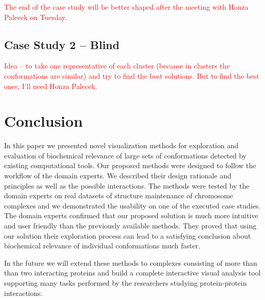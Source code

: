 \documentclass[journal]{vgtc}                %
\begin{document}
\textcolor{red}{The end of the case study will be better shaped after the meeting with Honza Palecek on Tuesday.}

\subsection{Case Study 2 -- Blind}
\textcolor{red}{Idea -- to take one representative of each cluster (because in clusters the conformations are similar) and try to find the best solutions. But to find the best ones, I'll need Honza Palecek.}

\section{Conclusion}
In this paper we presented novel visualization methods for exploration and evaluation of biochemical relevance of large sets of conformations detected by existing computational tools.
Our proposed methods were designed to follow the workflow of the domain experts.
We described their design rationale and principles as well as the possible interactions. 
The methods were tested by the domain experts on real datasets of structure maintenance of chromosome complexes and we demonstrated the usability on one of the executed case studies.
The domain experts confirmed that our proposed solution is much more intuitive and user friendly than the previously available methods.
They proved that using our solution their exploration process can lead to a satisfying conclusion about biochemical relevance of individual conformations much faster.

In the future we will extend these methods to complexes consisting of more than than two interacting proteins and build a complete interactive visual analysis tool supporting many tasks performed by the researchers studying protein-protein interactions. 


%

%
%
%

\end{document}
